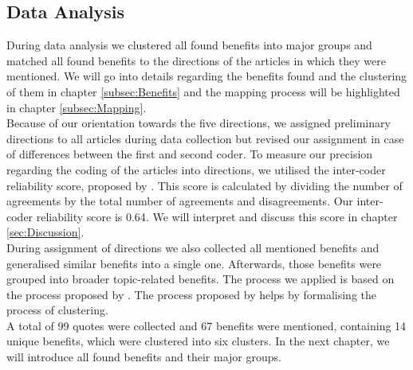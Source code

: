 \subsection{Data Analysis}
\label{subsec:DataAnalysis}
During data analysis we clustered all found benefits into major groups and matched all found benefits to the directions of the articles in which they were mentioned. We will go into details regarding the benefits found and the clustering of them in chapter \ref{subsec:Benefits} and the mapping process will be highlighted in chapter \ref{subsec:Mapping}.\\
Because of our orientation towards the five directions, we assigned preliminary directions to all articles during data collection but revised our assignment in case of differences between the first and second coder. To measure our precision regarding the coding of the articles into directions, we utilised the inter-coder reliability score, proposed by \cite{Miles.1994}.\autocite[cf.][46]{Miles.1994} This score is calculated by dividing the number of agreements by the total number of agreements and disagreements. Our inter-coder reliability score is 0.64. We will interpret and discuss this score in chapter \ref{sec:Discussion}. \\
During assignment of directions we also collected all mentioned benefits and generalised similar benefits into a single one. Afterwards, those benefits were grouped into broader topic-related benefits. The process we applied is based on the process proposed by \cite{Jankowicz.2004}.\autocite[cf.][149]{Jankowicz.2004} The process proposed by \cite{Jankowicz.2004} helps by formalising the process of clustering.\\
A total of 99 quotes were collected and 67 benefits were mentioned, containing 14 unique benefits, which were clustered into six clusters. In the next chapter, we will introduce all found benefits and their major groups.